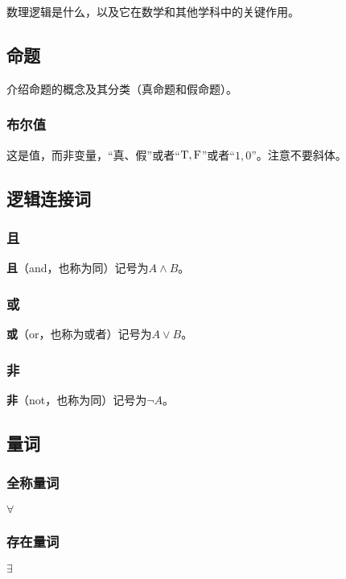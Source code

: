 
\begin{issues}
\issueDraft
\end{issues}
数理逻辑是什么，以及它在数学和其他学科中的关键作用。
\subsection{命题}
介绍命题的概念及其分类（真命题和假命题）。
\subsubsection{布尔值}
这是值，而非变量，“真、假”或者“${\rm T,F}$”或者“$1,0$”。注意不要斜体。
\subsection{逻辑连接词}
\subsubsection{且}
\textbf{且}（and，也称为同）记号为$A\land B$。
\subsubsection{或}
\textbf{或}（or，也称为或者）记号为$A\lor B$。
\subsubsection{非}
\textbf{非}（not，也称为同）记号为$\lnot A$。
\subsection{量词}
\subsubsection{全称量词}
$\forall$
\subsubsection{存在量词}
$\exists$
